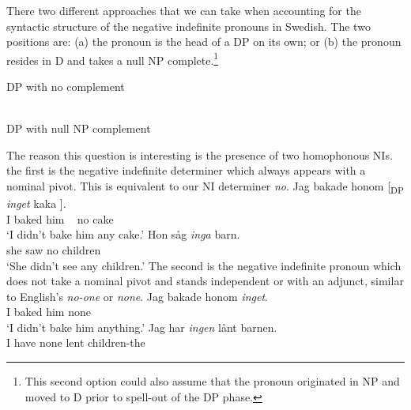 \documentclass[12pt, letterpaper]{article}
\begin{document}
\ea There two different approaches that we can take when accounting for the syntactic structure of the negative indefinite pronouns in Swedish. The two positions are: (a) the pronoun is the head of a DP on its own; or (b) the pronoun resides in D and takes a null NP complete.\footnote{This second option could also assume that the pronoun originated in NP and moved to D prior to spell-out of the DP phase.}
	\begin{multicols}{2}
	\begin{xlist}
		\ex DP with no complement \label{ex:NNP}\\
		\vspace{2em}\\
		\ex DP with null NP complement \label{ex:DN} \\
	\end{xlist}
	\end{multicols}
\ex The reason this question is interesting is the presence of two homophonous NIs. 
	\ea the first is the negative indefinite determiner which always appears with a nominal pivot. This is equivalent to our NI determiner \emph{no}.
		\ea 
		\gll Jag bakade honom [\textsubscript{DP} \emph{inget} kaka ].\\
		I baked him ~ no cake\\
		\glt `I didn't bake him any cake.'  
		\ex 
		\gll Hon såg \emph{inga} barn.\\
		she saw no children\\
		\glt `She didn't see any children.'
		\z  
	\ex The second is the negative indefinite pronoun which does not take a nominal pivot and stands independent or with an adjunct, similar to English's \emph{no-one} or \emph{none}.
		\ea 
		\gll Jag bakade honom \emph{inget}.\\
		I baked him none\\
		\glt `I didn't bake him anything.'
		\ex 
		\gll  Jag har \textit{ingen} lånt barnen.\\
		I have none lent children-the\\
\end{document}
